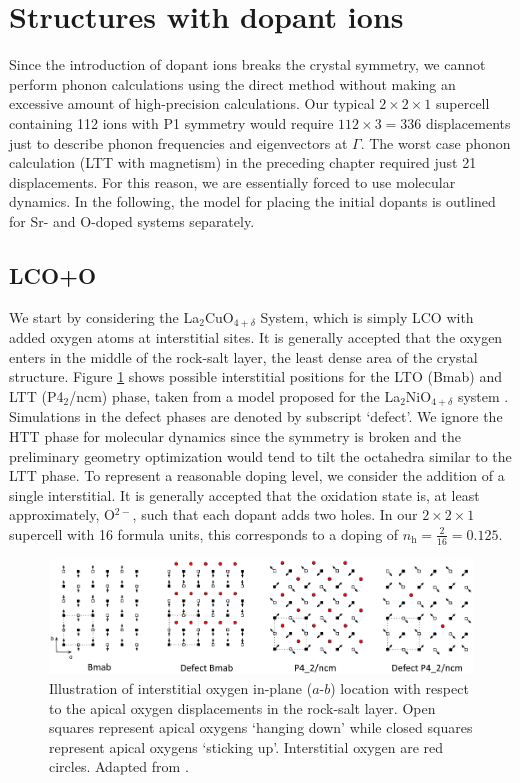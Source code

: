 \section{Structures with dopant ions}
Since the introduction of dopant ions breaks the crystal symmetry, we cannot perform phonon calculations using the direct method without making an excessive amount of high-precision calculations. Our typical $2 \times 2 \times 1$ supercell containing 112 ions with P1 symmetry would require $112 \times 3 = 336$ displacements just to describe phonon frequencies and eigenvectors at $\Gamma$. The worst case phonon calculation (LTT with magnetism) in the preceding chapter required just 21 displacements. For this reason, we are essentially forced to use molecular dynamics. In the following, the model for placing the initial dopants is outlined for Sr- and O-doped systems separately.

\subsection{LCO+O}
We start by considering the La$_2$CuO$_{4+\delta}$ System, which is simply LCO with added oxygen atoms at interstitial sites. It is generally accepted that the oxygen enters in the middle of the rock-salt layer, the least dense area of the crystal structure. Figure \ref{fig:oint_location} shows possible interstitial positions for the LTO (Bmab) and LTT (P4$_2$/ncm) phase, taken from a model proposed for the La$_2$NiO$_{4+\delta}$ system \cite{Tranquada1994}. Simulations in the defect phases are denoted by subscript `defect'. We ignore the HTT phase for molecular dynamics since the symmetry is broken and the preliminary geometry optimization would tend to tilt the octahedra similar to the LTT phase. To represent a reasonable doping level, we consider the addition of a single interstitial. It is generally accepted that the oxidation state is, at least approximately, O$^{2-}$, such that each dopant adds two holes. In our $2 \times 2 \times 1$ supercell with 16 formula units, this corresponds to a doping of $n_\text{h} = \frac{2}{16} = 0.125$.

\begin{figure}
    \centering
    \includegraphics[width=\textwidth]{fig/md/oint.png}
    \caption[Illustration of interstitial positions]{Illustration of interstitial oxygen in-plane ($a$-$b$) location with respect to the apical oxygen displacements in the rock-salt layer. Open squares represent apical oxygens `hanging down' while closed squares represent apical oxygens `sticking up'. Interstitial oxygen are red circles. Adapted from \cite{Tranquada1994}.}
    \label{fig:oint_location}
\end{figure}

